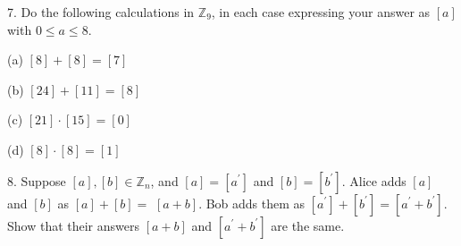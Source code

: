 \documentclass{hippoidC}
\begin{document}
\begin{prooflist}{7. Do the following calculations in $\mathbb{Z}_9$, in each case expressing your answer as $[a]$ with $0 \leq a \leq 8$.}
	\item
	      (a) $[8]+[8] = [7]$
	\item
	      (b) $[24]+[11] = [8]$
	\item
	      (c) $[21] \cdot[15] = [0]$
	\item
	      (d) $[8] \cdot [8] = [1]$
\end{prooflist}

\begin{prooflist}{8. Suppose $[a],[b] \in \mathbb{Z}_n$, and $[a]=\left[a^{\prime}\right]$ and $[b]=\left[b^{\prime}\right]$. Alice adds $[a]$ and $[b]$ as $[a]+[b]=$ $[a+b]$. Bob adds them as $\left[a^{\prime}\right]+\left[b^{\prime}\right]=\left[a^{\prime}+b^{\prime}\right]$. Show that their answers $[a+b]$ and $\left[a^{\prime}+b^{\prime}\right]$ are the same.}
	\item
\end{prooflist}
\end{document}
